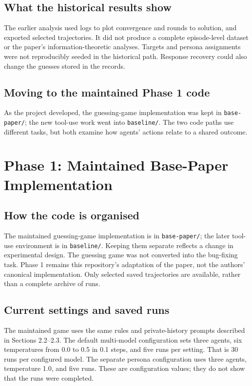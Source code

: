 \documentclass[12pt,a4paper,oneside]{report}
\begin{document}
\section{What the historical results show}
The earlier analysis used logs to plot convergence and rounds to solution, and exported selected trajectories. It did not produce a complete episode-level dataset or the paper’s information-theoretic analyses. Targets and persona assignments were not reproducibly seeded in the historical path. Response recovery could also change the guesses stored in the records.

\section{Moving to the maintained Phase 1 code}
As the project developed, the guessing-game implementation was kept in \texttt{base-paper/}; the new tool-use work went into \texttt{baseline/}. The two code paths use different tasks, but both examine how agents’ actions relate to a shared outcome.

\chapter{Phase 1: Maintained Base-Paper Implementation}
\label{chapter-03}
\thispagestyle{plain}
\section{How the code is organised}
The maintained guessing-game implementation is in \texttt{base-paper/}; the later tool-use environment is in \texttt{baseline/}. Keeping them separate reflects a change in experimental design. The guessing game was not converted into the bug-fixing task. Phase 1 remains this repository’s adaptation of the paper, not the authors’ canonical implementation. Only selected saved trajectories are available, rather than a complete archive of runs.

\section{Current settings and saved runs}
The maintained game uses the same rules and private-history prompts described in Sections 2.2–2.3. The default multi-model configuration sets three agents, six temperatures from 0.0 to 0.5 in 0.1 steps, and five runs per setting. That is 30 runs per configured model. The separate persona configuration uses three agents, temperature 1.0, and five runs. These are configuration values; they do not show that the runs were completed.
\end{document}
